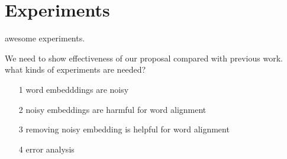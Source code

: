 \section{Experiments}
	awesome experiments.

	We need to show effectiveness of our proposal compared with previous work.
	what kinds of experiments are needed?


	\begin{itemize}
		\item[1] word embedddings are noisy
		\item[2] noisy embeddings are harmful for word alignment
		\item[3] removing noisy embedding is helpful for word alignment
		\item[4] error analysis
	\end{itemize}


